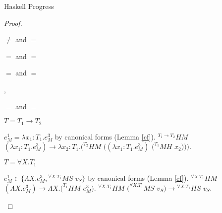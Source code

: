 \begin{theorem}{Haskell Progress}
\begin{proof}
\begin{case}{\pshm}
\begin{subcase}{\first{\vartyh} $\neq$ \tylump and \first{\vartym} $=$ \tylump}
\end{subcase}

\begin{subcase}{\first{\vartyh} $=$ \tynum and \first{\vartym} $=$ \tynum}

\psvaleqm
{\first{\varexpm}}
{\tynum}
{\expnum{\varnum}}
\psred
{\exphm{\tynum}{\tynum}{\expnum{\varnum}}}
{\expnum{\varnum}}

\end{subcase}

\begin{subcase}{\first{\vartyh} $=$ \tylist{\second{\vartyh}} and \first{\vartym} $=$ \tylist{\second\vartym}}

\renewcommand{\x}{\expnils{\third{\vartym}}\xspace}
\renewcommand{\y}{\expcons{\first{\varvalum}}{\second{\varvalum}}\xspace}

\psvalinm
{\first{\varexpm}}
{\tylist{\third{\vartym}}}
{\x, \y}
\psred
{\exphm{\tylist{\second{\vartyh}}}{\tylist{\second{\vartym}}}{(\x)}}
{\expnils{\second{\vartyh}}}
\psred
{\exphm{\tylist{\second{\vartyh}}}{\tylist{\second{\vartym}}}{(\y)}}
{\expcons{(\exphm{\second{\vartyh}}{\second{\vartym}}{\first{\varvalum}})}{(\exphm{\tylist{\second{\vartyh}}}{\tylist{\second{\vartym}}}{\second{\varvalum}})}}

\end{subcase}

\begin{subcase}{\first{\vartyh} $=$ \tyfun{\second{\vartyh}}{\third{\vartyh}} and \first{\vartym} $=$ \tyfun{\second{\vartym}}{\third{\vartym}}}


$T=T_{1}\rightarrow T_{2}$

$e_{M}^{1}=\lambda x_{1}:T_{1}.e_{M}^{3}$ by canonical forms (Lemma \ref{cf}).  $^{T_{1}\rightarrow T_{2}}HM$ $(\lambda x_{1}:T_{1}.e_{M}^{3})\rightarrow\lambda x_{2}:T_{1}.(^{T_{2}}HM$ $((\lambda x_{1}:T_{1}.e_{M}^{3})$ $(^{T_{1}}MH$ $x_{2})))$.

\end{subcase}

\begin{subcase}

$T=\forall X.T_{1}$

$e_{M}^{1}\in\lbrace\Lambda X.e_{M}^{3},{^{\forall X.T_{1}}M}S$ $v_{S}\rbrace$ by canonical forms (Lemma \ref{cf}).  $^{\forall X.T_{1}}HM$ $(\Lambda X.e_{M}^{3})\rightarrow\Lambda X.(^{T_{1}}HM$ $e_{M}^{3})$.  $^{\forall X.T_{1}}HM$ $(^{\forall X.T_{1}}MS$ $v_{S})\rightarrow{^{\forall X.T_{1}}H}S$ $v_{S}$.


\end{subcase}
\end{case}
\end{proof}
\end{theorem}
